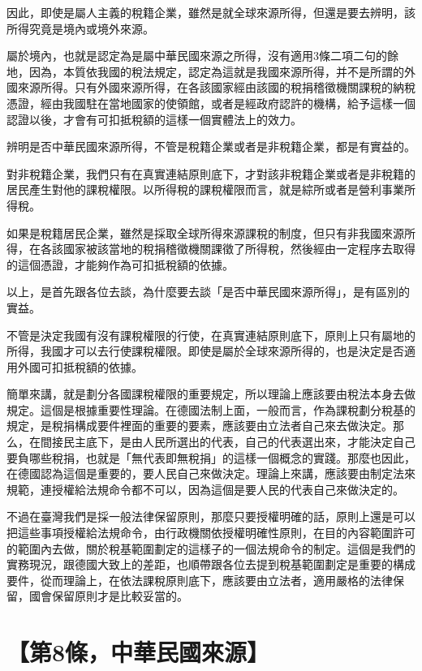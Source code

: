 \documentclass[]{ctexbook}
\begin{document}
因此，即使是屬人主義的稅籍企業，雖然是就全球來源所得，但還是要去辨明，該所得究竟是境內或境外來源。

屬於境內，也就是認定為是屬中華民國來源之所得，沒有適用3條二項二句的餘地，因為，本質依我國的稅法規定，認定為這就是我國來源所得，并不是所謂的外國來源所得。只有外國來源所得，在各該國家經由該國的稅捐稽徵機關課稅的納稅憑證，經由我國駐在當地國家的使領館，或者是經政府認許的機構，給予這樣一個認證以後，才會有可扣抵稅額的這樣一個實體法上的效力。

辨明是否中華民國來源所得，不管是稅籍企業或者是非稅籍企業，都是有實益的。

對非稅籍企業，我們只有在真實連結原則底下，才對該非稅籍企業或者是非稅籍的居民產生對他的課稅權限。以所得稅的課稅權限而言，就是綜所或者是營利事業所得稅。

如果是稅籍居民企業，雖然是採取全球所得來源課稅的制度，但只有非我國來源所得，在各該國家被該當地的稅捐稽徵機關課徵了所得稅，然後經由一定程序去取得的這個憑證，才能夠作為可扣抵稅額的依據。

以上，是首先跟各位去談，為什麼要去談「是否中華民國來源所得」，是有區別的實益。

不管是決定我國有沒有課稅權限的行使，在真實連結原則底下，原則上只有屬地的所得，我國才可以去行使課稅權限。即使是屬於全球來源所得的，也是決定是否適用外國可扣抵稅額的依據。

簡單來講，就是劃分各國課稅權限的重要規定，所以理論上應該要由稅法本身去做規定。這個是根據重要性理論。在德國法制上面，一般而言，作為課稅劃分稅基的規定，是稅捐構成要件裡面的重要的要素，應該要由立法者自己來去做決定。那么，在間接民主底下，是由人民所選出的代表，自己的代表選出來，才能決定自己要負哪些稅捐，也就是「無代表即無稅捐」的這樣一個概念的實踐。那麼也因此，在德國認為這個是重要的，要人民自己來做決定。理論上來講，應該要由制定法來規範，連授權給法規命令都不可以，因為這個是要人民的代表自己來做決定的。

不過在臺灣我們是採一般法律保留原則，那麼只要授權明確的話，原則上還是可以把這些事項授權給法規命令，由行政機關依授權明確性原則，在目的內容範圍許可的範圍內去做，關於稅基範圍劃定的這樣子的一個法規命令的制定。這個是我們的實務現況，跟德國大致上的差距，也順帶跟各位去提到稅基範圍劃定是重要的構成要件，從而理論上，在依法課稅原則底下，應該要由立法者，適用嚴格的法律保留，國會保留原則才是比較妥當的。

\hypertarget{ux7b2c8ux689dux4e2dux83efux6c11ux570bux4f86ux6e90}{%
\section{【第8條，中華民國來源】}\label{ux7b2c8ux689dux4e2dux83efux6c11ux570bux4f86ux6e90}}
\end{document}
